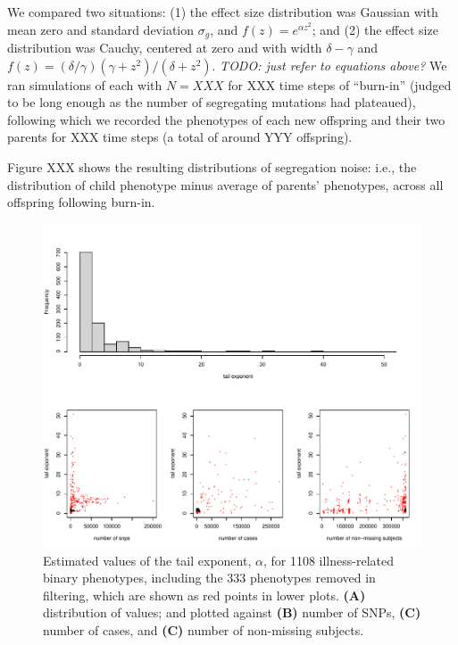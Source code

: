 \documentclass{article}
\newcommand{\comment}[1]{{\color{blue} \it #1}}
\theoremstyle{remark}
\theoremstyle{definition}
\begin{document}
We compared two situations:
(1) the effect size distribution was Gaussian with mean zero and standard deviation $\sigma_g$,
and $f(z) = e^{\alpha z^2}$; and
(2) the effect size distribution was Cauchy, centered at zero and with width $\delta - \gamma$
and $f(z) = (\delta/\gamma) (\gamma + z^2) / (\delta + z^2)$.
\comment{TODO: just refer to equations above?}
We ran simulations of each with $N=XXX$ for XXX time steps of ``burn-in''
(judged to be long enough as the number of segregating mutations had plateaued),
following which we recorded the phenotypes of each new offspring and their two parents
for XXX time steps (a total of around YYY offspring).

Figure XXX shows the resulting distributions of segregation noise:
i.e., the distribution of child phenotype minus average of parents' phenotypes,
across all offspring following burn-in.





\appendix

\begin{figure}
    \begin{center}
    \includegraphics{snp_effects/unfiltered_results_10}
    \end{center}
    \caption{
        Estimated values of the tail exponent, $\alpha$,
        for 1108 illness-related binary phenotypes,
        including the 333 phenotypes removed in filtering,
        which are shown as red points in lower plots.
        \textbf{(A)} distribution of values; and plotted against
        \textbf{(B)} number of SNPs,
        \textbf{(C)} number of cases, and
        \textbf{(C)} number of non-missing subjects.
        \label{fig:unfiltered_hist}
    }
\end{figure}
\end{document}
